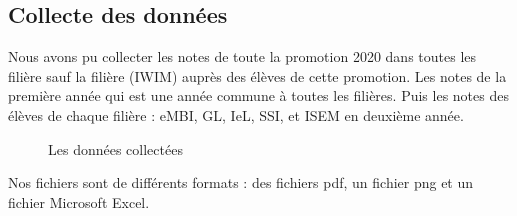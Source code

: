 \documentclass{article}
\begin{document}
            \subsection{Collecte des données}
                Nous avons pu collecter les notes de toute la promotion 2020 dans toutes les filière sauf la filière (IWIM) auprès des élèves de cette promotion. Les notes de la première année qui est une année commune à toutes les filières. Puis les notes des élèves de chaque filière : eMBI, GL, IeL, SSI, et ISEM en deuxième année.\par
                \begin{figure}[h!]
                    \centering
                    \caption{Les données collectées}
                    \label{fig:2}
                \end{figure} 
                Nos fichiers sont de différents formats : des fichiers pdf, un fichier png et un fichier Microsoft Excel.\\
\end{document}
